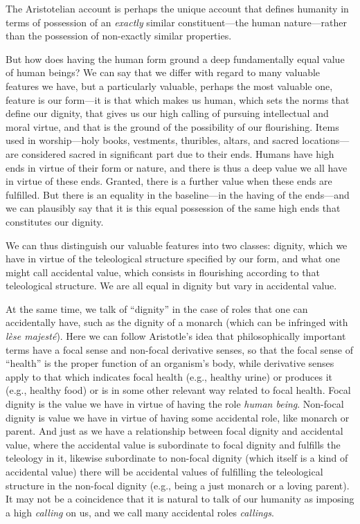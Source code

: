 The Aristotelian account is perhaps the unique account that defines humanity in terms of possession of an \textit{exactly}
similar constituent---the human nature---rather than the possession of non-exactly similar properties. 

But how does having the human form ground a deep fundamentally equal value of human beings? We can say that we differ with regard 
to many valuable features we have, but a particularly valuable, perhaps the most valuable one, feature is our form---it is 
that which makes us human, which sets the norms that define our dignity, that gives us our high calling of pursuing intellectual and moral virtue, and 
that is the ground of the possibility of our flourishing. Items used in  worship---holy books, vestments, thuribles, 
altars, and sacred locations---are considered sacred in significant part due to their ends. Humans have high ends in
virtue of their form or nature, and there is thus a
deep value we all have in virtue of these ends. Granted, there is a further value when these ends are fulfilled. 
But there is an equality in the baseline---in the having of the ends---and we can plausibly say that it is this equal
possession of the same high ends that constitutes our dignity. 

We can thus distinguish our valuable features into two classes: dignity, which we have in virtue of the teleological structure
specified by our form, and what one might call accidental value, which consists in flourishing according to that teleological structure.
We are all equal in dignity but vary in accidental value. 

At the same time, we talk of ``dignity'' in the case of roles that one can accidentally have, such as the dignity of a monarch
(which can be infringed with \textit{l\`ese majest\'e}). Here we can follow Aristotle's idea that philosophically important terms have a 
focal sense and non-focal derivative senses, so that the focal sense of ``health'' is the proper function of an organism's body, 
while derivative senses apply to that which indicates focal health (e.g., healthy urine) or produces it (e.g., healthy food) or is in
some other relevant way related to focal health. Focal dignity is the value we have in virtue of having the role \textit{human being}.
Non-focal dignity is value we have in virtue of having some accidental role, like monarch or parent. And just as we have a relationship
between focal dignity and accidental value, where the accidental value is subordinate to focal dignity and fulfills the teleology 
in it, likewise subordinate to non-focal dignity (which itself is a kind of accidental value) there will be accidental values of
fulfilling the teleological structure in the non-focal dignity (e.g., being a just monarch or a loving parent). It may not be a 
coincidence that it is natural to talk of our humanity as imposing a high \textit{calling} on us, and we call many accidental roles
\textit{callings}.

